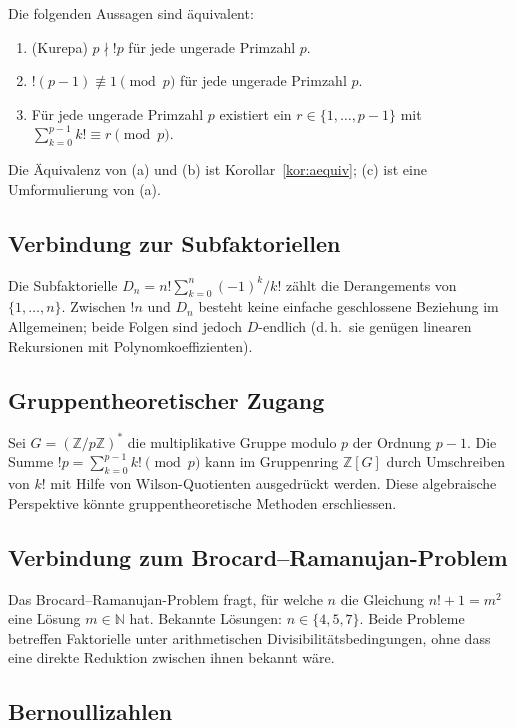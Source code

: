 \documentclass[12pt,a4paper]{amsart}
\theoremstyle{definition}
\newcommand{\N}{\mathbb{N}}
\newcommand{\Z}{\mathbb{Z}}
\begin{document}
Die folgenden Aussagen sind äquivalent:
\begin{enumerate}[label=(\alph*)]
\item (Kurepa) $p \nmid !p$ für jede ungerade Primzahl $p$.
\item $!(p-1) \not\equiv 1 \pmod{p}$ für jede ungerade Primzahl $p$.
\item Für jede ungerade Primzahl $p$ existiert ein $r \in \{1,\ldots,p-1\}$
      mit $\sum_{k=0}^{p-1} k! \equiv r \pmod{p}$.
\end{enumerate}

Die Äquivalenz von (a) und (b) ist Korollar~\ref{kor:aequiv};
(c) ist eine Umformulierung von (a).

\subsection{Verbindung zur Subfaktoriellen}

Die Subfaktorielle $D_n = n! \sum_{k=0}^n (-1)^k/k!$ zählt die
Derangements von $\{1,\ldots,n\}$.
Zwischen $!n$ und $D_n$ besteht keine einfache geschlossene Beziehung im
Allgemeinen; beide Folgen sind jedoch $D$-endlich (d.\,h.\ sie genügen
linearen Rekursionen mit Polynomkoeffizienten).

\subsection{Gruppentheoretischer Zugang}

Sei $G = (\Z/p\Z)^*$ die multiplikative Gruppe modulo $p$ der Ordnung $p-1$.
Die Summe $!p = \sum_{k=0}^{p-1} k! \pmod p$ kann im Gruppenring $\Z[G]$
durch Umschreiben von $k!$ mit Hilfe von Wilson-Quotienten ausgedrückt werden.
Diese algebraische Perspektive könnte gruppentheoretische Methoden erschliessen.

\subsection{Verbindung zum Brocard--Ramanujan-Problem}

Das Brocard--Ramanujan-Problem fragt, für welche $n$ die Gleichung
$n! + 1 = m^2$ eine Lösung $m \in \N$ hat.
Bekannte Lösungen: $n \in \{4, 5, 7\}$.
Beide Probleme betreffen Faktori\-elle unter arithmetischen
Divisibilitätsbedingungen, ohne dass eine direkte Reduktion zwischen ihnen
bekannt wäre.

\subsection{Bernoullizahlen}
\end{document}
